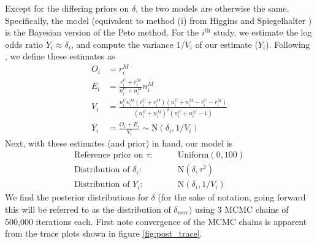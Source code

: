 \documentclass[fleqn,10pt]{SelfArx} %
\begin{document}
Except for the differing priors on $\delta$, the two models are otherwise the same. Specifically, the model (equivalent to method (i) from Higgins and Spiegelhalter \cite{Original}) is the Bayesian version of the Peto method. For the $i^{\textrm{th}}$ study, we estimate the log odds ratio $Y_i \approx \delta_i$, and compute the variance $1/V_i$ of our estimate ($Y_i$). Following \cite{Original}, we define these estimates as
\begin{align*}
O_i &= r_i^M \\
E_i &= \frac{r_i^C + r_i^M}{n_i^C + n_i^M}n_i^M \\
V_i &= \frac{n_i^Cn_i^M(r_i^C + r_i^M)(n_i^C + n_i^M - r_i^C - r_i^M)}{(n_i^C + n_i^M)^2(n_i^C + n_i^M-1)} \\
Y_i &= \frac{O_i + E_i}{V_i} \sim \textrm{N}(\delta_i, 1/V_i)
\end{align*}
Next, with these estimates (and prior) in hand, our model is
\begin{align*}
\textrm{Reference prior on }\tau:&\qquad{} \textrm{Uniform}(0,100) \\
\textrm{Distribution of }\delta_i:&\qquad{} \textrm{N}(\delta,\tau^2) \\
\textrm{Distribution of }Y_i:&\qquad{} \textrm{N}(\delta_i,1/V_i)
\end{align*}
We find the posterior distributions for $\delta$ (for the sake of notation, going forward this will be referred to as the distribution of $\delta_{new}$) using 3 MCMC chains of 500,000 iterations each. First note convergence of the MCMC chains is apparent from the trace plots shown in figure \ref{fig:post_trace}. 
\end{document}
